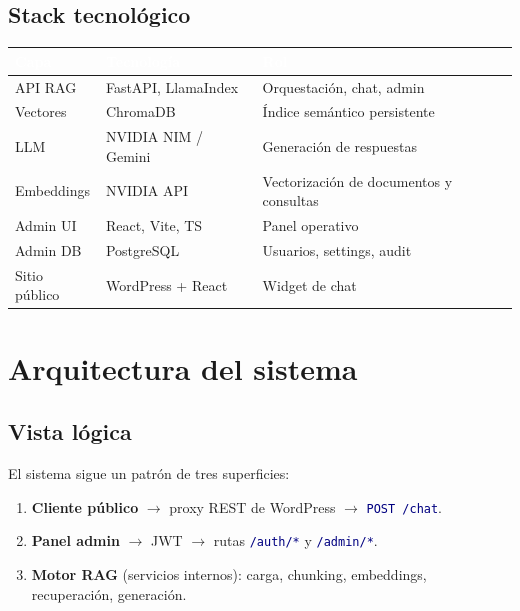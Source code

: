 \documentclass[11pt, a4paper, oneside]{report}
\newcommand{\ruta}[1]{\texttt{\textcolor{navy}{#1}}}
\begin{document}
\section{Stack tecnológico}
\begin{tabularx}{\linewidth}{L{3.5cm} L{3.8cm} Y}
  \toprule
  \textcolor{white}{\textbf{Capa}} &
  \textcolor{white}{\textbf{Tecnología}} &
  \textcolor{white}{\textbf{Rol}} \\
  \midrule
  API RAG & FastAPI, LlamaIndex & Orquestación, chat, admin \\
  Vectores & ChromaDB & Índice semántico persistente \\
  LLM & NVIDIA NIM / Gemini & Generación de respuestas \\
  Embeddings & NVIDIA API & Vectorización de documentos y consultas \\
  Admin UI & React, Vite, TS & Panel operativo \\
  Admin DB & PostgreSQL & Usuarios, settings, audit \\
  Sitio público & WordPress + React & Widget de chat \\
  \bottomrule
\end{tabularx}

\chapter{Arquitectura del sistema}

\section{Vista lógica}
El sistema sigue un patrón de tres superficies:

\begin{enumerate}
  \item \textbf{Cliente público} $\rightarrow$ proxy REST de WordPress
        $\rightarrow$ \ruta{POST /chat}.
  \item \textbf{Panel admin} $\rightarrow$ JWT $\rightarrow$ rutas \ruta{/auth/*}
        y \ruta{/admin/*}.
  \item \textbf{Motor RAG} (servicios internos): carga, chunking, embeddings,
        recuperación, generación.
\end{enumerate}
\end{document}
